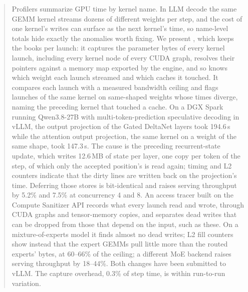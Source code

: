 \begin{abstract}
Profilers summarize GPU time by kernel name. In LLM decode the same GEMM kernel streams dozens of
different weights per step, and the cost of one kernel's writes can surface as the next kernel's
time, so name-level totals hide exactly the anomalies worth fixing. We present \sys{}, which keeps
the books per launch: it captures the parameter bytes of every kernel launch, including every
kernel node of every CUDA graph, resolves their pointers against a memory map exported by the
engine, and so knows which weight each launch streamed and which caches it touched. It compares
each launch with a measured bandwidth ceiling and flags launches of the same kernel on same-shaped
weights whose times diverge, naming the preceding kernel that touched a cache. On a DGX Spark
running Qwen3.8-27B with multi-token-prediction speculative decoding in vLLM, the output
projection of the Gated DeltaNet layers took 194.6\,\textmu s while the attention output
projection, the same kernel on a weight of the same shape, took 147.3\,\textmu s. The cause is the
preceding recurrent-state update, which writes 12.6\,MB of state per layer, one copy per token of the step,
of which only the accepted position's is read again; timing and L2 counters indicate that the
dirty lines are written back on the projection's time. Deferring those stores is bit-identical and raises serving throughput by 5.2\% and 7.5\% at concurrency 4
and 8. An access tracer built on the Compute Sanitizer API records what every launch read and
wrote, through CUDA graphs and tensor-memory copies, and separates dead writes that can be dropped
from those that depend on the input, such as these. On a mixture-of-experts model it finds almost
no dead writes; L2 fill counters show instead that the expert GEMMs pull little more than the routed
experts' bytes, at 60--66\% of the ceiling; a different MoE backend raises serving throughput by 18--44\%. Both changes have
been submitted to vLLM. The capture overhead, 0.3\% of step time, is within run-to-run variation.
\end{abstract}
